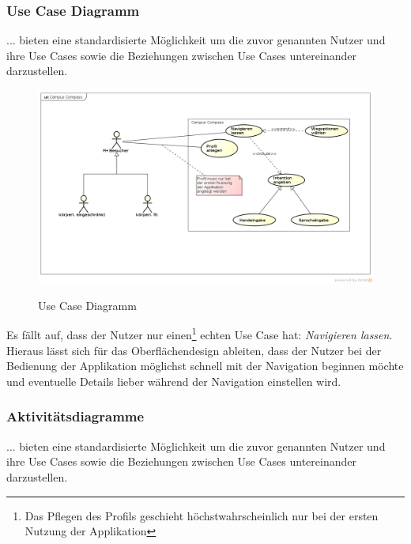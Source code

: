 \subsubsection*{Use Case Diagramm}
... bieten eine standardisierte Möglichkeit um die zuvor genannten Nutzer und ihre Use Cases sowie die Beziehungen zwischen Use Cases untereinander darzustellen.

\begin{figure}[hbt]
  \centering
  \includegraphics[width=\linewidth]{img/use-case-diagram.png}
  \label{img:use-case-diagramm}
  \caption{Use Case Diagramm}
\end{figure}

\noindent Es fällt auf, dass der Nutzer nur einen\footnote{Das Pflegen des Profils geschieht höchstwahrscheinlich nur bei der ersten Nutzung der Applikation} echten Use Case hat: \emph{Navigieren lassen}. Hieraus lässt sich für das Oberflächendesign ableiten, dass der Nutzer bei der Bedienung der Applikation möglichst schnell mit der Navigation beginnen möchte und eventuelle Details lieber während der Navigation einstellen wird. 

\subsubsection*{Aktivitätsdiagramme}
... bieten eine standardisierte Möglichkeit um die zuvor genannten Nutzer und ihre Use Cases sowie die Beziehungen zwischen Use Cases untereinander darzustellen.

